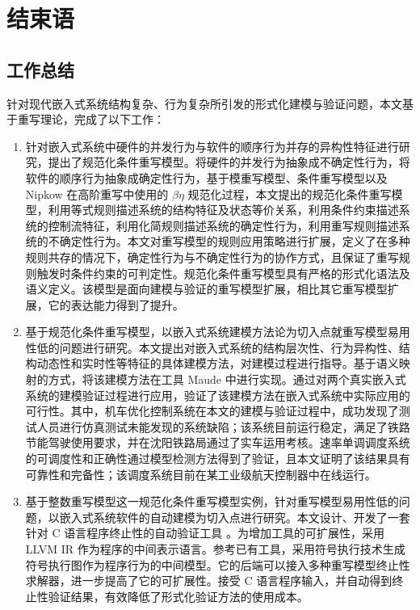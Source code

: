 \chapter{结束语}
\label{cha:conclusion}

\section{工作总结}

针对现代嵌入式系统结构复杂、行为复杂所引发的形式化建模与验证问题，本文基于重写理论，完成了以下工作：

\begin{enumerate}
\item 
针对嵌入式系统中硬件的并发行为与软件的顺序行为并存的异构性特征进行研究，提出了规范化条件重写模型。将硬件的并发行为抽象成不确定性行为，将软件的顺序行为抽象成确定性行为，基于模重写模型、条件重写模型以及 Nipkow 在高阶重写中使用的 $\beta\eta$ 规范化过程，本文提出的规范化条件重写模型，利用等式规则描述系统的结构特征及状态等价关系，利用条件约束描述系统的控制流特征，利用化简规则描述系统的确定性行为，利用重写规则描述系统的不确定性行为。本文对重写模型的规则应用策略进行扩展，定义了在多种规则共存的情况下，确定性行为与不确定性行为的协作方式，且保证了重写规则触发时条件约束的可判定性。规范化条件重写模型具有严格的形式化语法及语义定义。该模型是面向建模与验证的重写模型扩展，相比其它重写模型扩展，它的表达能力得到了提升。

\item
基于规范化条件重写模型，以嵌入式系统建模方法论为切入点就重写模型易用性低的问题进行研究。本文提出对嵌入式系统的结构层次性、行为异构性、结构动态性和实时性等特征的具体建模方法，对建模过程进行指导。基于语义映射的方式，将该建模方法在工具 Maude 中进行实现。通过对两个真实嵌入式系统的建模验证过程进行应用，验证了该建模方法在嵌入式系统中实际应用的可行性。其中，机车优化控制系统在本文的建模与验证过程中，成功发现了测试人员进行仿真测试未能发现的系统缺陷；该系统目前运行稳定，满足了铁路节能驾驶使用要求，并在沈阳铁路局通过了实车运用考核。速率单调调度系统的可调度性和正确性通过模型检测方法得到了验证，且本文证明了该结果具有可靠性和完备性；该调度系统目前在某工业级航天控制器中在线运行。

\item 
基于整数重写模型这一规范化条件重写模型实例，针对重写模型易用性低的问题，以嵌入式系统软件的自动建模为切入点进行研究。本文设计、开发了一套针对 C 语言程序终止性的自动验证工具 \CTerm。为增加工具的可扩展性，\CTerm 采用 LLVM IR 作为程序的中间表示语言。参考已有工具，\CTerm 采用符号执行技术生成符号执行图作为程序行为的中间模型。它的后端可以接入多种重写模型终止性求解器，进一步提高了它的可扩展性。\CTerm 接受 C 语言程序输入，并自动得到终止性验证结果，有效降低了形式化验证方法的使用成本。
\end{enumerate}

